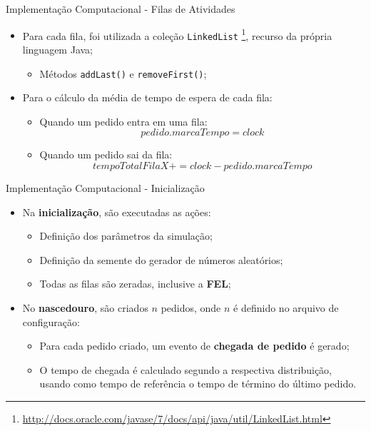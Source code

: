 \documentclass[xcolor=dvipsnames]{beamer}
\let\olditem=\item%
\renewcommand{\item}{\olditem \justifying}%
\begin{document}
\begin{frame}{Implementação Computacional - Filas de Atividades}
	\begin{itemize}
		\item Para cada fila, foi utilizada a coleção \texttt{LinkedList} \footnote{\url{http://docs.oracle.com/javase/7/docs/api/java/util/LinkedList.html}}, recurso da própria linguagem Java;
        \bigskip
		      \begin{itemize}
		      	\item Métodos \texttt{addLast()} e \texttt{removeFirst()};
		      \end{itemize}
		      \bigskip
		\item Para o cálculo da média de tempo de espera de cada fila:
        	\medskip
		      \begin{itemize}
		      	\item Quando um pedido entra em uma fila: $$ pedido.marcaTempo = clock $$
		      	\item Quando um pedido sai da fila: $$ tempoTotalFilaX += clock - pedido.marcaTempo $$
		      \end{itemize}
	\end{itemize}
\end{frame}
	
\begin{frame}{Implementação Computacional - Inicialização}
\fontsize{10pt}{7.2}\selectfont
	\begin{itemize}
		\item Na \textbf{inicialização}, são executadas as ações:
		      \bigskip
		      \begin{itemize}
		      	\item Definição dos parâmetros da simulação;
		      	      \bigskip
		      	\item Definição da semente do gerador de números aleatórios;
		      	      \bigskip
		      	\item Todas as filas são zeradas, inclusive a \textbf{FEL};
                \bigskip
               \end{itemize}
                \item No \textbf{nascedouro}, são criados $n$ pedidos, onde $n$ é definido no arquivo de configuração:
		      \bigskip
              \begin{itemize}
		\item Para cada pedido criado, um evento de \textbf{chegada de pedido} é gerado;
		      \bigskip
		\item O tempo de chegada é calculado segundo a respectiva distribuição, usando como tempo de referência o tempo de término do último pedido.
        \end{itemize}
	\end{itemize}
\end{frame}
	
\end{document}
